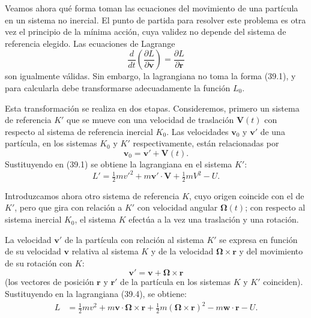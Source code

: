 \documentclass[12pt]{article}
\begin{document}
Veamos ahora qué forma toman las ecuaciones del movimiento de una partícula en un sistema no inercial. El punto de partida para resolver este problema es otra vez el principio de la mínima acción, cuya validez no depende del sistema de referencia elegido. Las ecuaciones de Lagrange
\begin{equation}
\frac{d}{dt} \left( \frac{\partial L}{\partial \mathbf{v}} \right) = \frac{\partial L}{\partial \mathbf{r}}
\tag{39.2}
\end{equation}
son igualmente válidas. Sin embargo, la lagrangiana no toma la forma (39.1), y para calcularla debe transformarse adecuadamente la función $L_0$.

Esta transformación se realiza en dos etapas. Consideremos, primero un sistema de referencia $K'$ que se mueve con una velocidad de traslación $\mathbf{V}(t)$ con respecto al sistema de referencia inercial $K_0$. Las velocidades $\mathbf{v}_0$ y $\mathbf{v}'$ de una partícula, en los sistemas $K_0$ y $K'$ respectivamente, están relacionadas por
\begin{equation}
\mathbf{v}_0 = \mathbf{v}' + \mathbf{V}(t).
\tag{39.3}
\end{equation}
Sustituyendo en (39.1) se obtiene la lagrangiana en el sistema $K'$:
\[
L' = \tfrac{1}{2} m v'^2 + m \mathbf{v}' \cdot \mathbf{V} + \tfrac{1}{2} m V^2 - U.
\]

\vspace{1em}

Introduzcamos ahora otro sistema de referencia $K$, cuyo origen coincide con el de $K'$, pero que gira con relación a $K'$ con velocidad angular $\mathbf{\Omega}(t)$; con respecto al sistema inercial $K_0$, el sistema $K$ efectúa a la vez una traslación y una rotación.

La velocidad $\mathbf{v'}$ de la partícula con relación al sistema $K'$ se expresa en función de su velocidad $\mathbf{v}$ relativa al sistema $K$ y de la velocidad $\mathbf{\Omega} \times \mathbf{r}$ y del movimiento de su rotación con $K$:
\[
\mathbf{v'} = \mathbf{v} + \mathbf{\Omega} \times \mathbf{r}
\]
(los vectores de posición $\mathbf{r}$ y $\mathbf{r}'$ de la partícula en los sistemas $K$ y $K'$ coinciden).
Sustituyendo en la lagrangiana (39.4), se obtiene:
\begin{align}
L &= \tfrac{1}{2} m v^2 + m \mathbf{v} \cdot \mathbf{\Omega} \times \mathbf{r} + \tfrac{1}{2} m (\mathbf{\Omega} \times \mathbf{r})^2 - m \mathbf{w} \cdot \mathbf{r} - U.
\tag{39.6}
\end{align}
\end{document}
